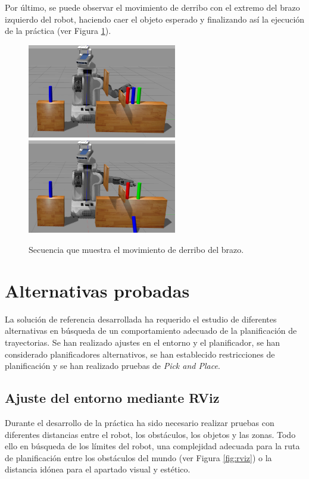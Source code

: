 \documentclass[12pt,spanish,chapterprefix, numbers=noenddot]{book}
\numberwithin{equation}{section}
\numberwithin{figure}{section}
\begin{document}
Por último, se puede observar el movimiento de derribo con el extremo del brazo izquierdo del robot, haciendo caer el objeto esperado y finalizando así la ejecución de la práctica (ver Figura \ref{fig:fase5}). 
\newpage
\begin{figure}[hbt!]
\centering
\includegraphics[width=6.5cm]{Figs/frame1910.png}
\includegraphics[width=6.5cm]{Figs/frame2264.png}
\par
\caption{\label{fig:fase5}Secuencia que muestra el movimiento de derribo del brazo.}
\end{figure}

\section{Alternativas probadas}
La solución de referencia desarrollada ha requerido el estudio de diferentes alternativas en búsqueda de un comportamiento adecuado de la planificación de trayectorias. Se han realizado ajustes en el entorno y el planificador, se han considerado planificadores alternativos, se han establecido restricciones de planificación y se han realizado pruebas de \textit{Pick and Place}.  

\subsection{Ajuste del entorno mediante RViz}

Durante el desarrollo de la práctica ha sido necesario realizar pruebas con diferentes distancias entre el robot, los obstáculos, los objetos y las zonas. Todo ello en búsqueda de los límites del robot, una complejidad adecuada para la ruta de planificación entre los obstáculos del mundo (ver Figura \ref{fig:rviz}) o la distancia idónea para el apartado visual y estético. 
\end{document}

